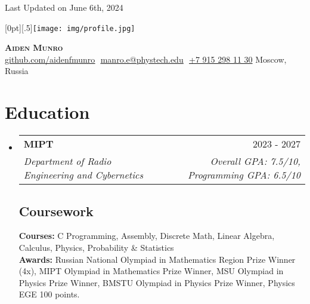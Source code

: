 \documentclass[letterpaper,11pt]{article}
\makeatletter
\newcommand{\resumeSubheading}[4]{
  \vspace{-2pt}\item
    \begin{tabular*}{0.97\textwidth}[t]{l@{\extracolsep{\fill}}r}
      \textbf{#1} & #2 \\
      \textit{\small#3} & \textit{\small #4} \\
    \end{tabular*}\vspace{-7pt}
}
\newcommand{\resumeSubHeadingListStart}{\begin{itemize}[leftmargin=0.15in, label={}]}
\newcommand{\resumeSubHeadingListEnd}{\end{itemize}}
\makeatother
\begin{document}
\begin{flushright}
  \color{gray}
  \item
  Last Updated on June 6th, 2024
\end{flushright}

\vspace{-5pt}

\raisebox{-.7\totalheight}[0pt][.5\totalheight]{\texttt{[image: img/profile.jpg]}}

\begin{center}
    \textbf{\Huge \scshape Aiden Munro} \\ \vspace{8pt}
    \small 
    \href{https://github.com/aidenfmunro}{\underline{github.com/aidenfmunro}} $  $
    \href{mailto:manro.e@phystech.edu}{\underline{manro.e@phystech.edu}} $ $
    \underline{+7 915 298 11 30} 
    Moscow, Russia
\end{center}

\section{Education}
  \resumeSubHeadingListStart
  
    \resumeSubheading
      {MIPT}{2023 - 2027}
      {Department of Radio Engineering and Cybernetics}{Overall GPA: 7.5/10, Programming GPA: 6.5/10}

    \vspace{-10pt}

    \subsection{Coursework}
      \textbf{Courses:} C Programming, Assembly, Discrete Math, Linear Algebra, Calculus, Physics, Probability \& Statistics \\
      \textbf{Awards:} Russian National Olympiad in Mathematics Region Prize Winner (4x), MIPT Olympiad in Mathematics Prize Winner, MSU Olympiad in Physics Prize Winner, BMSTU Olympiad in Physics Prize Winner, Physics EGE 100 points.

  \resumeSubHeadingListEnd

\end{document}
